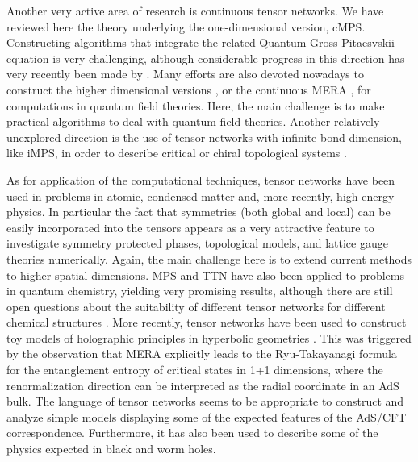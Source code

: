 \documentclass[rmp,aps,reprint,superscriptaddress,nobalancelastpage]{revtex4-1}
\begin{document}
    Another very active area of research is continuous tensor networks. We have reviewed here the theory underlying the one-dimensional version, cMPS. Constructing algorithms that integrate the related Quantum-Gross-Pitaesvskii equation \cite{haegeman2017quantum} is very challenging, although considerable progress in this direction has very recently been made by \citet{tuybens2020variational}. Many efforts are also devoted nowadays to construct the higher dimensional versions \cite{tilloy2019continuous}, or the continuous MERA \cite{haegeman2013entanglement,zou2019magic,cotler2019entanglement,fernandez2019entanglement,fernandez:cmera-qft}, for computations in quantum field theories. Here, the main challenge is to make practical algorithms to deal with quantum field theories. Another relatively unexplored direction is the use of tensor networks with infinite bond dimension, like iMPS, in order to describe critical or chiral topological systems \cite{cirac2010infinite,nielsen2013local,tu2014lattice,nielsen2012laughlin}.

    As for application of the computational techniques, tensor networks have been used in problems in atomic, condensed matter and, more recently, high-energy physics. In particular the fact that symmetries (both global and local) can be easily incorporated into the tensors appears as a very attractive feature to investigate symmetry protected phases, topological models, and lattice gauge theories numerically. Again, the main challenge here is to extend current methods to higher spatial dimensions. MPS and TTN have also been applied to problems in quantum chemistry, yielding very promising results, although there are still open questions about the suitability of different tensor networks for different chemical structures \cite{white1999ab,chan2011density,szalay2015tensor}. More recently, tensor networks have been used to construct toy models of holographic principles in hyperbolic geometries \cite{swingle:mera-ads-cft,pastawski:holography,hayden:holographic-duality-from-tn}. This was triggered by the observation that MERA explicitly leads to the Ryu-Takayanagi formula for the entanglement entropy of critical states in 1+1 dimensions, where the renormalization direction can be interpreted as the radial coordinate in an AdS bulk. The language of tensor networks seems to be appropriate to construct and analyze simple models displaying some of the expected features of the AdS/CFT correspondence. Furthermore, it has also been used to describe some of the physics expected in black and worm holes.
\end{document}
